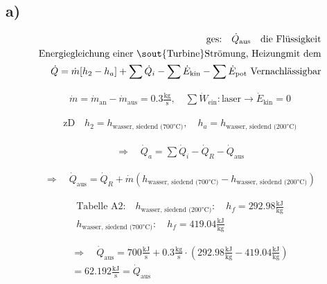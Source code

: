 

\subsection*{a)}

\begin{align*}
\text{ges:} \quad \dot{Q}_{\text{aus}} \quad \text{die Flüssigkeit} \\
\text{Energiegleichung einer } \text{\sout{Turbine}} \text{Strömung, Heizung} \text{mit dem} \\
\dot{Q} = \dot{m} [h_2 - h_a] + \sum \dot{Q}_i - \sum \dot{E}_{\text{kin}} - \sum \dot{E}_{\text{pot}} \text{ Vernachlässigbar}
\end{align*}

\begin{align*}
\dot{m} = \dot{m}_{\text{an}} - \dot{m}_{\text{aus}} = 0.3 \frac{\text{kg}}{\text{s}}, \quad \sum \dot{W}_{\text{ein}}: \text{laser} \rightarrow \dot{E}_{\text{kin}} = 0
\end{align*}

\begin{align*}
\text{zD} \quad h_2 = h_{\text{wasser, siedend (700°C)}}, \quad h_a = h_{\text{wasser, siedend (200°C)}}
\end{align*}

\begin{align*}
\Rightarrow \quad \dot{Q}_a = \sum \dot{Q}_i - \dot{Q}_R - \dot{Q}_{\text{aus}}
\end{align*}

\begin{align*}
\Rightarrow \quad \dot{Q}_{\text{aus}} = \dot{Q}_R + \dot{m} (h_{\text{wasser, siedend (700°C)}} - h_{\text{wasser, siedend (200°C)}})
\end{align*}

\begin{align*}
\text{Tabelle A2:} \quad h_{\text{wasser, siedend (200°C)}}: \quad h_f = 292.98 \frac{\text{kJ}}{\text{kg}} \\
h_{\text{wasser, siedend (700°C)}}: \quad h_f = 419.04 \frac{\text{kJ}}{\text{kg}}
\end{align*}

\begin{align*}
\Rightarrow \quad \dot{Q}_{\text{aus}} = 700 \frac{\text{kJ}}{\text{s}} + 0.3 \frac{\text{kg}}{\text{s}} \cdot (292.98 \frac{\text{kJ}}{\text{kg}} - 419.04 \frac{\text{kJ}}{\text{kg}}) \\
= 62.192 \frac{\text{kJ}}{\text{s}} = \dot{Q}_{\text{aus}}
\end{align*}

